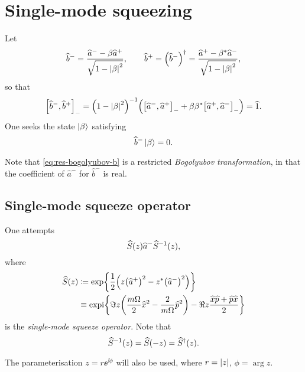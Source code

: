 \section{Single-mode squeezing}

Let
\begin{equation}
\widehat{b}^-
= \frac{\widehat{a}^- - \beta \widehat{a}^+}{\sqrt{1-{\left|\beta\right|}^2}},\qquad
\widehat{b}^+ = {\left(\widehat{b}^-\right)}^\dagger
= \frac{\widehat{a}^+ - \beta^*\widehat{a}^-}{\sqrt{1-{\left|\beta\right|}^2}},
\label{eq:res-bogolyubov-b}
\end{equation}
so that
\begin{equation}
{\left[\widehat{b}^-, \widehat{b}^+\right]}_- =
{\left(1-{\left|\beta\right|}^2\right)}^{-1}{\left({\left[\widehat{a}^-, \widehat{a}^+\right]}_-
+ \beta\beta^*{\left[\widehat{a}^+, \widehat{a}^-\right]}_-\right)} = \widehat{1}.
\end{equation}
One seeks the state $\Ket{\beta}$ satisfying
\begin{equation}
\widehat{b}^-\Ket{\beta} = 0.
\label{eq:squeezed-state-def-1}
\end{equation}

Note that \cref{eq:res-bogolyubov-b} is a restricted \emph{Bogolyubov
transformation}, in that the coefficient of $\widehat{a}^-$ for $\widehat{b}^-$
is real.

\subsection{Single-mode squeeze operator}
One attempts
\begin{equation}
{\widehat{S}}\mathopen{}\left(z\right)\mathclose{}\widehat{a}^-{\widehat{S}^{-1}}\mathopen{}\left(z\right)\mathclose{},
\end{equation}
where
\begin{align}
	\rfun{\widehat{S}}{z} &\coloneqq \cfun{\exp}{\frac{1}{2}\rbr{z 
		\rbr{\widehat{a}^+}^2 - z^*\rbr{\widehat{a}^-}^2}} \nonumber \\
&\equiv \cfun{\expi}%
{\Im z\rbr{\frac{m\Omega}{2}\widehat{x}^2 - \frac{2}{m\Omega}\widehat{p}^2}
-\Re z \frac{\widehat{x}\widehat{p}+\widehat{p}\widehat{x}}{2}}
\end{align}
is the \emph{single-mode squeeze operator}. Note that
\begin{equation}
{\widehat{S}^{-1}}\mathopen{}\left(z\right)\mathclose{} = {\widehat{S}}\mathopen{}\left(-z\right)\mathclose{}
= {\widehat{S}^\dagger}\mathopen{}\left(z\right)\mathclose{}.
\end{equation}

The parameterisation $z = r\ee^{\ii\phi}$ will also be used, where $r = 
{\left|z\right|}$, $\phi = \arg z$.

